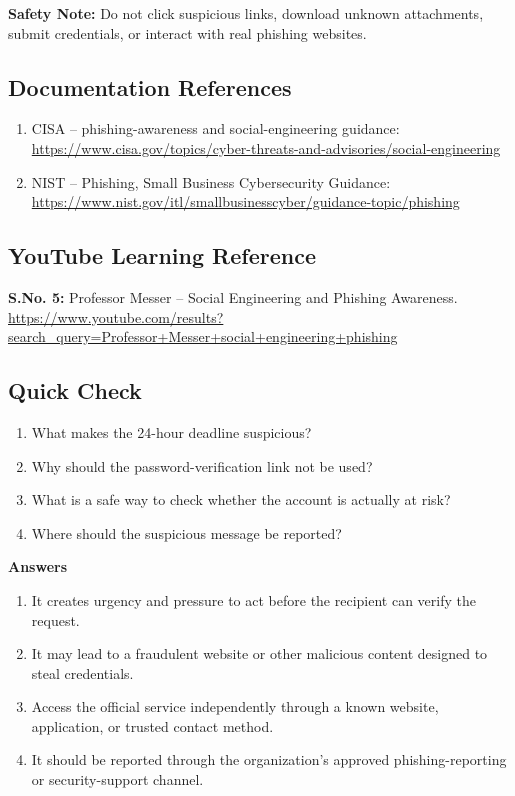 \documentclass[11pt,a4paper]{article}
\begin{document}
\textbf{Safety Note:} Do not click suspicious links, download unknown attachments, submit credentials, or interact with real phishing websites.

\subsection{Documentation References}

\begin{enumerate}
    \item CISA -- phishing-awareness and social-engineering guidance: \url{https://www.cisa.gov/topics/cyber-threats-and-advisories/social-engineering}
    \item NIST -- Phishing, Small Business Cybersecurity Guidance: \url{https://www.nist.gov/itl/smallbusinesscyber/guidance-topic/phishing}
\end{enumerate}

\subsection{YouTube Learning Reference}

\textbf{S.No. 5:} Professor Messer -- Social Engineering and Phishing Awareness.\\
\url{https://www.youtube.com/results?search_query=Professor+Messer+social+engineering+phishing}

\subsection{Quick Check}

\begin{enumerate}
    \item What makes the 24-hour deadline suspicious?
    \item Why should the password-verification link not be used?
    \item What is a safe way to check whether the account is actually at risk?
    \item Where should the suspicious message be reported?
\end{enumerate}

\textbf{Answers}
\begin{enumerate}
    \item It creates urgency and pressure to act before the recipient can verify the request.
    \item It may lead to a fraudulent website or other malicious content designed to steal credentials.
    \item Access the official service independently through a known website, application, or trusted contact method.
    \item It should be reported through the organization's approved phishing-reporting or security-support channel.
\end{enumerate}
\end{document}
